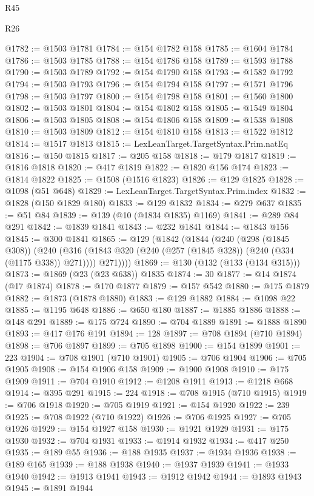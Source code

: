 \begin{lexlean}{R45}
\begin{lexlean}{R26}
\begin{coremodule}
{{{{{{{{{{{{{{{{{{{{{{{{{{{{{{{{{{{{{{{{{{{{{{{{{{{{{{{{{{{{{{{{{{{{{{{{@1782 := @1503 @1781
@1784 := @154 @1782 @158
@1785 := @1604 @1784
@1786 := @1503 @1785
@1788 := @154 @1786 @158
@1789 := @1593 @1788
@1790 := @1503 @1789
@1792 := @154 @1790 @158
@1793 := @1582 @1792
@1794 := @1503 @1793
@1796 := @154 @1794 @158
@1797 := @1571 @1796
@1798 := @1503 @1797
@1800 := @154 @1798 @158
@1801 := @1560 @1800
@1802 := @1503 @1801
@1804 := @154 @1802 @158
@1805 := @1549 @1804
@1806 := @1503 @1805
@1808 := @154 @1806 @158
@1809 := @1538 @1808
@1810 := @1503 @1809
@1812 := @154 @1810 @158
@1813 := @1522 @1812
@1814 := @1517 @1813
@1815 := LexLeanTarget.TargetSyntax.Prim.natEq
@1816 := @150 @1815
@1817 := @205 @158
@1818 := @179 @1817
@1819 := @1816 @1818
@1820 := @417 @1819
@1822 := @1820 @156 @174
@1823 := @1814 @1822
@1825 := @1508 (@1516 @1823)
@1826 := @129 @1825
@1828 := @1098 (@51 @648)
@1829 := LexLeanTarget.TargetSyntax.Prim.index
@1832 := @1828 (@150 @1829 @180)
@1833 := @129 @1832
@1834 := @279 @637
@1835 := @51 @84
@1839 := @139 (@10 (@1834 @1835) @1169)
@1841 := @289 @84 @291
@1842 := @1839 @1841
@1843 := @232 @1841
@1844 := @1843 @156
@1845 := @300 @1841
@1865 := @129
    (@1842
      (@1844
        (@240
          (@298 (@1845 @308))
          (@240
            (@316 (@1843 @320 (@240 (@257 (@1845 @328)) (@240 (@334 (@1175 @338)) @271))))
            @271))))
@1869 := @130 (@132 (@133 (@134 @315)))
@1873 := @1869 (@23 (@23 @638)) @1835
@1874 := 30
@1877 := @14 @1874 (@17 @1874)
@1878 := @170 @1877
@1879 := @157 @542
@1880 := @175 @1879
@1882 := @1873 (@1878 @1880)
@1883 := @129 @1882
@1884 := @1098 @22
@1885 := @1195 @648
@1886 := @650 @180
@1887 := @1885 @1886
@1888 := @148 @291
@1889 := @175 @724
@1890 := @704 @1889
@1891 := @1888 @1890
@1893 := @417 @176 @191
@1894 := 128
@1897 := @708 @1894 (@710 @1894)
@1898 := @706 @1897
@1899 := @705 @1898
@1900 := @154 @1899
@1901 := 223
@1904 := @708 @1901 (@710 @1901)
@1905 := @706 @1904
@1906 := @705 @1905
@1908 := @154 @1906 @158
@1909 := @1900 @1908
@1910 := @175 @1909
@1911 := @704 @1910
@1912 := @1208 @1911
@1913 := @1218 @668
@1914 := @395 @291
@1915 := 224
@1918 := @708 @1915 (@710 @1915)
@1919 := @706 @1918
@1920 := @705 @1919
@1921 := @154 @1920
@1922 := 239
@1925 := @708 @1922 (@710 @1922)
@1926 := @706 @1925
@1927 := @705 @1926
@1929 := @154 @1927 @158
@1930 := @1921 @1929
@1931 := @175 @1930
@1932 := @704 @1931
@1933 := @1914 @1932
@1934 := @417 @250
@1935 := @189 @55
@1936 := @188 @1935
@1937 := @1934 @1936
@1938 := @189 @165
@1939 := @188 @1938
@1940 := @1937 @1939
@1941 := @1933 @1940
@1942 := @1913 @1941
@1943 := @1912 @1942
@1944 := @1893 @1943
@1945 := @1891 @1944
}}}}}}}}}}}}}}}}}}}}}}}}}}}}}}}}}}}}}}}}}}}}}}}}}}}}}}}}}}}}}}}}}}}}}}}}
\end{coremodule}
\end{lexlean}
\end{lexlean}
